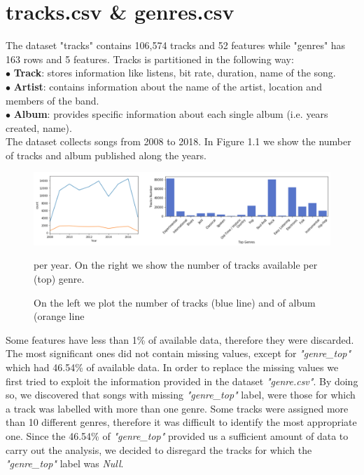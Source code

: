 \section{tracks.csv \& genres.csv}

The dataset "tracks" contains 106,574 tracks and 52 features while "genres" has 163 rows and 5 features. 
Tracks is partitioned in the following way: \\
$\bullet$  \textbf{Track}: stores information like listens, bit rate, duration, name of the song.\\
$\bullet$ \textbf{Artist}: contains information about the name of the artist, location and members of the band.\\
$\bullet$ \textbf{Album}: provides specific information about each single album (i.e. years created, name).\\
The dataset collects songs from 2008 to 2018. In Figure 1.1 we show the number of tracks and album published along the years.

\begin{figure}[hp]
  \centering
  \includegraphics[width=0.9\linewidth]{images/year_tracks-genre-per-track.png}
  \caption{On the left we plot the number of tracks (blue line) and of album (orange line} per year. On the right we show the number of tracks available per (top) genre.
\end{figure} 



Some features have less than 1\% of available data, therefore they were discarded. The most significant ones did not contain missing values, except for \textit{"genre\_top"} which had 46.54\% of available data. In order to replace the missing values we first tried to exploit the information provided in the dataset \textit{"genre.csv"}. By doing so, we discovered that songs with missing \textit{"genre\_top"} label, were those for which a track was labelled with more than one genre. Some tracks were assigned more than 10 different genres, therefore it was difficult to identify the most appropriate one. Since the 46.54\% of \textit{"genre\_top"} provided us a sufficient amount of data to carry out the analysis, we decided to disregard the tracks for which the \textit{"genre\_top"} label was \textit{Null}. 

